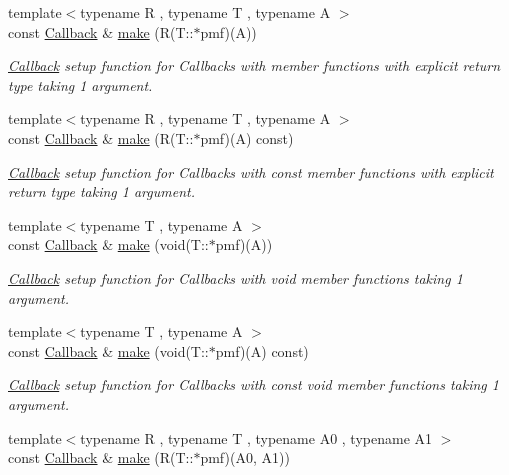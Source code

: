 \begin{DoxyCompactItemize}
{\footnotesize template$<$typename R , typename T , typename A $>$ }\\const \hyperlink{class_d_d4hep_1_1_callback}{Callback} \& \hyperlink{class_d_d4hep_1_1_callback_abacbff587652ee2ae4bf2aa7e733a7e6}{make} (R(T\+::$\ast$pmf)(A))
\begin{DoxyCompactList}\small\item\em \hyperlink{class_d_d4hep_1_1_callback}{Callback} setup function for Callbacks with member functions with explicit return type taking 1 argument. \end{DoxyCompactList}\item 
{\footnotesize template$<$typename R , typename T , typename A $>$ }\\const \hyperlink{class_d_d4hep_1_1_callback}{Callback} \& \hyperlink{class_d_d4hep_1_1_callback_ac35b72a21035b63b2c8474fd334524f5}{make} (R(T\+::$\ast$pmf)(A) const)
\begin{DoxyCompactList}\small\item\em \hyperlink{class_d_d4hep_1_1_callback}{Callback} setup function for Callbacks with const member functions with explicit return type taking 1 argument. \end{DoxyCompactList}\item 
{\footnotesize template$<$typename T , typename A $>$ }\\const \hyperlink{class_d_d4hep_1_1_callback}{Callback} \& \hyperlink{class_d_d4hep_1_1_callback_a2b3daea36eaa426e35e594741c706e4d}{make} (void(T\+::$\ast$pmf)(A))
\begin{DoxyCompactList}\small\item\em \hyperlink{class_d_d4hep_1_1_callback}{Callback} setup function for Callbacks with void member functions taking 1 argument. \end{DoxyCompactList}\item 
{\footnotesize template$<$typename T , typename A $>$ }\\const \hyperlink{class_d_d4hep_1_1_callback}{Callback} \& \hyperlink{class_d_d4hep_1_1_callback_a54e0c87cbab3d6ab42e44a16bd35a538}{make} (void(T\+::$\ast$pmf)(A) const)
\begin{DoxyCompactList}\small\item\em \hyperlink{class_d_d4hep_1_1_callback}{Callback} setup function for Callbacks with const void member functions taking 1 argument. \end{DoxyCompactList}\item 
{\footnotesize template$<$typename R , typename T , typename A0 , typename A1 $>$ }\\const \hyperlink{class_d_d4hep_1_1_callback}{Callback} \& \hyperlink{class_d_d4hep_1_1_callback_abf4ba6d9c58d25400e610a7673454902}{make} (R(T\+::$\ast$pmf)(A0, A1))

\end{DoxyCompactItemize}
